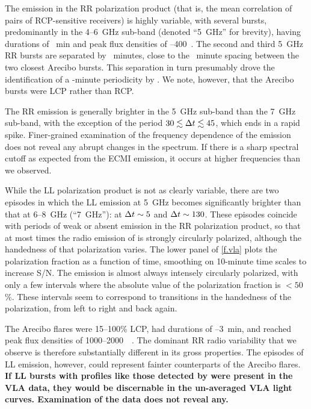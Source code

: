 \documentclass[twocolumn, times]{aastex6}
\begin{document}
The emission in the RR polarization product (that is, the mean correlation of
pairs of RCP-sensitive receivers) is highly variable, with several bursts,
predominantly in the 4--6~GHz sub-band (denoted ``5~GHz'' for brevity), having
durations of ~min and peak flux densities of --400~\ujy. The
second and third 5~GHz RR bursts are separated by ~minutes, close to the
~minute spacing between the two closest Arecibo bursts. This
separation in turn presumably drove the identification of a -minute
periodicity by \citet{rw16}. We note, however, that the Arecibo bursts were
LCP rather than RCP.

The RR emission is generally brighter in the 5~GHz sub-band than the 7~GHz
sub-band, with the exception of the period $30 \lesssim {\Delta t} \lesssim 45$,
which ends in a rapid spike. Finer-grained examination of the frequency
dependence of the emission does not reveal any abrupt changes in the spectrum.
If there is a sharp spectral cutoff as expected from the ECMI emission, it
occurs at higher frequencies than we observed.

While the LL polarization product is not as clearly variable, there are two
episodes in which the LL emission at 5~GHz becomes significantly brighter than
that at 6--8~GHz (``7~GHz''): at ${\Delta t} \sim 5$ and ${\Delta t} \sim 130$. These
episodes coincide with periods of weak or absent emission in the RR
polarization product, so that at most times the radio emission of
 is strongly circularly polarized, although the handedness of
that polarization varies. The lower panel of \autoref{f.vla} plots the
polarization fraction as a function of time, smoothing on 10-minute time
scales to increase S/N. The emission is almost always intensely circularly
polarized, with only a few intervals where the absolute value of the
polarization fraction is ${<}50$\%. These intervals seem to correspond to
transitions in the handedness of the polarization, from left to right and back
again.

The Arecibo flares were 15--100\% LCP, had durations of --3~min, and
reached peak flux densities of 1000--2000~\ujy\ \citep{rw16}. The dominant RR
radio variability that we observe is therefore substantially different in its
gross properties. The episodes of LL emission, however, could represent
fainter counterparts of the Arecibo flares. \textbf{If LL bursts with profiles
  like those detected by \citet{rw16} were present in the VLA data, they would
  be discernable in the un-averaged VLA light curves. Examination of the data
  does not reveal any.}
\end{document}
